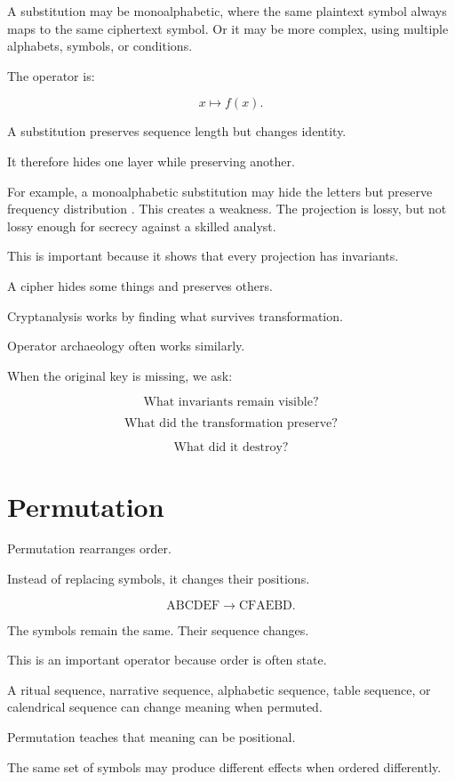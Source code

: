 \documentclass[11pt]{book}
\begin{document}
A substitution may be monoalphabetic, where the same plaintext symbol always maps to the same ciphertext symbol. Or it may be more complex, using multiple alphabets, symbols, or conditions.

The operator is:

\[
x \mapsto f(x).
\]

A substitution preserves sequence length but changes identity.

It therefore hides one layer while preserving another.

For example, a monoalphabetic substitution may hide the letters but preserve frequency distribution \cite{Kahn1996Codebreakers,Singh1999CodeBook}. This creates a weakness. The projection is lossy, but not lossy enough for secrecy against a skilled analyst.

This is important because it shows that every projection has invariants.

A cipher hides some things and preserves others.

Cryptanalysis works by finding what survives transformation.

Operator archaeology often works similarly.

When the original key is missing, we ask:

\[
\text{What invariants remain visible?}
\]

\[
\text{What did the transformation preserve?}
\]

\[
\text{What did it destroy?}
\]

\section{Permutation}

Permutation rearranges order.

Instead of replacing symbols, it changes their positions.

\[
\text{ABCDEF} \rightarrow \text{CFAEBD}.
\]

The symbols remain the same. Their sequence changes.

This is an important operator because order is often state.

A ritual sequence, narrative sequence, alphabetic sequence, table sequence, or calendrical sequence can change meaning when permuted.

Permutation teaches that meaning can be positional.

The same set of symbols may produce different effects when ordered differently.
\end{document}
